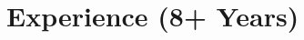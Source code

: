 \documentclass{subfiles}
\begin{document}
\section{Experience (8+ Years)}


% 
% 


% 


% 
\end{document}

